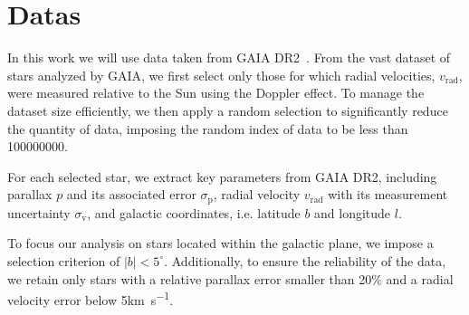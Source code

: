 \section{Datas}

In this work we will use data taken from GAIA DR2~\cite{GAIADR2}. From the vast dataset of stars analyzed by GAIA, we first select only those for which radial velocities, $v_{\text{rad}}$, were measured relative to the Sun using the Doppler effect. To manage the dataset size efficiently, we then apply a random selection to significantly reduce the quantity of data, imposing the random index of data to be less than 100000000. 

For each selected star, we extract key parameters from GAIA DR2, including parallax $p$ and its associated error $\sigma_{\text{p}}$, radial velocity $v_{\text{rad}}$ with its measurement uncertainty $\sigma_{\text{v}}$, and galactic coordinates, i.e. latitude $b$ and longitude $l$.

To focus our analysis on stars located within the galactic plane, we impose a selection criterion of $\vert b \vert < 5^{\circ}$. Additionally, to ensure the reliability of the data, we retain only stars with a relative parallax error smaller than 20$\%$ and a radial velocity error below 5\unit{\kilo\meter\per\second}.
